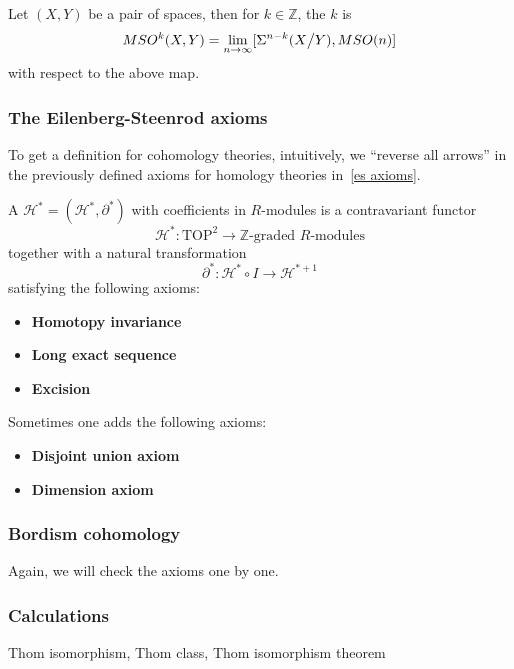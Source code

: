 \documentclass[a4paper,11pt]{article}
\begin{document}
\begin{definition}
    Let \((X,Y)\) be a pair of spaces, then for \(k\in\mathbb{Z}\), the \(k\) is
    \[MSO^k(X,Y)=\lim_{n\to\infty}[\Sigma^{n-k}(X\big/Y),MSO(n)]\]
    with respect to the above map.
\end{definition}

\subsubsection{The Eilenberg-Steenrod axioms}
To get a definition for cohomology theories, intuitively, we \enquote{reverse all arrows} in the previously defined axioms for homology theories in\ \ref{es axioms}.

\begin{definition}
    A  \(\mathcal{H}^\ast=(\mathcal{H}^\ast,\partial^\ast)\) with coefficients in \(R\)-modules is a contravariant functor \[\mathcal{H}^\ast:\mathrm{TOP}^2\to\mathbb{Z}\text{-graded }R\text{-modules}\] together with a natural transformation \[\partial^\ast:\mathcal{H}^\ast\circ I\to\mathcal{H}^{\ast+1}\] satisfying the following axioms:
    \begin{itemize}
        \item \textbf{Homotopy invariance}
        \item \textbf{Long exact sequence}
        \item \textbf{Excision}
    \end{itemize}
    Sometimes one adds the following axioms:
    \begin{itemize}
        \item \textbf{Disjoint union axiom}
        \item \textbf{Dimension axiom}
    \end{itemize}
\end{definition}

\subsubsection{Bordism cohomology}
Again, we will check the axioms one by one.

\subsubsection{Calculations}

Thom isomorphism, Thom class, Thom isomorphism theorem


\newpage\printbibliography%
\end{document}
